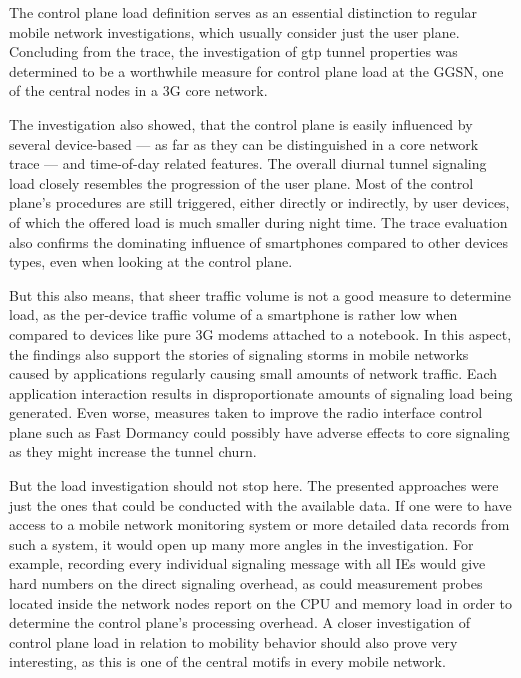 The control plane load definition serves as an essential distinction to regular mobile network investigations, which usually consider just the user plane. Concluding from the trace, the investigation of \gls{gtp} tunnel properties was determined to be a worthwhile measure for control plane load at the \gls{GGSN}, one of the central nodes in a \gls{3G} core network.

The investigation also showed, that the control plane is easily influenced by several device-based --- as far as they can be distinguished in a core network trace --- and time-of-day related features. The overall diurnal tunnel signaling load closely resembles the progression of the user plane. Most of the control plane's procedures are still triggered, either directly or indirectly, by user devices, of which the offered load is much smaller during night time. The trace evaluation also confirms the dominating influence of smartphones compared to other devices types, even when looking at the control plane.

But this also means, that sheer traffic volume is not a good measure to determine load, as the per-device traffic volume of a smartphone is rather low when compared to devices like pure \gls{3G} modems attached to a notebook. In this aspect, the findings also support the stories of signaling storms in mobile networks caused by applications regularly causing small amounts of network traffic. Each application interaction results in disproportionate amounts of signaling load being generated. Even worse, measures taken to improve the radio interface control plane such as Fast Dormancy could possibly have adverse effects to core signaling as they might increase the tunnel churn.

But the load investigation should not stop here. The presented approaches were just the ones that could be conducted with the available data. If one were to have access to a mobile network monitoring system or more detailed data records from such a system, it would open up many more angles in the investigation. For example, recording every individual signaling message with all \glspl{IE} would give hard numbers on the direct signaling overhead, as could measurement probes located inside the network nodes report on the CPU and memory load in order to determine the control plane's processing overhead. A closer investigation of control plane load in relation to mobility behavior should also prove very interesting, as this is one of the central motifs in every mobile network.

